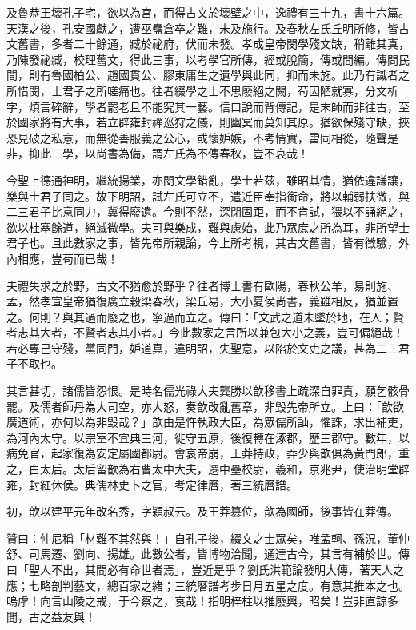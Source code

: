 \begin{pinyinscope}
及魯恭王壞孔子宅，欲以為宮，而得古文於壞壁之中，逸禮有三十九，書十六篇。天漢之後，孔安國獻之，遭巫蠱倉卒之難，未及施行。及春秋左氏丘明所修，皆古文舊書，多者二十餘通，臧於祕府，伏而未發。孝成皇帝閔學殘文缺，稍離其真，乃陳發祕臧，校理舊文，得此三事，以考學官所傳，經或脫簡，傳或間編。傳問民間，則有魯國柏公、趙國貫公、膠東庸生之遺學與此同，抑而未施。此乃有識者之所惜閔，士君子之所嗟痛也。往者綴學之士不思廢絕之闕，苟因陋就寡，分文析字，煩言碎辭，學者罷老且不能究其一藝。信口說而背傳記，是末師而非往古，至於國家將有大事，若立辟雍封禪巡狩之儀，則幽冥而莫知其原。猶欲保殘守缺，挾恐見破之私意，而無從善服義之公心，或懷妒嫉，不考情實，雷同相從，隨聲是非，抑此三學，以尚書為備，謂左氏為不傳春秋，豈不哀哉！

今聖上德通神明，繼統揚業，亦閔文學錯亂，學士若茲，雖昭其情，猶依違謙讓，樂與士君子同之。故下明詔，試左氏可立不，遣近臣奉指銜命，將以輔弱扶微，與二三君子比意同力，冀得廢遺。今則不然，深閉固距，而不肯試，猥以不誦絕之，欲以杜塞餘道，絕滅微學。夫可與樂成，難與慮始，此乃眾庶之所為耳，非所望士君子也。且此數家之事，皆先帝所親論，今上所考視，其古文舊書，皆有徵驗，外內相應，豈苟而已哉！

夫禮失求之於野，古文不猶愈於野乎？往者博士書有歐陽，春秋公羊，易則施、孟，然孝宣皇帝猶復廣立穀梁春秋，梁丘易，大小夏侯尚書，義雖相反，猶並置之。何則？與其過而廢之也，寧過而立之。傳曰：「文武之道未墜於地，在人；賢者志其大者，不賢者志其小者。」今此數家之言所以兼包大小之義，豈可偏絕哉！若必專己守殘，黨同門，妒道真，違明詔，失聖意，以陷於文吏之議，甚為二三君子不取也。

其言甚切，諸儒皆怨恨。是時名儒光祿大夫龔勝以歆移書上疏深自罪責，願乞骸骨罷。及儒者師丹為大司空，亦大怒，奏歆改亂舊章，非毀先帝所立。上曰：「歆欲廣道術，亦何以為非毀哉？」歆由是忤執政大臣，為眾儒所訕，懼誅，求出補吏，為河內太守。以宗室不宜典三河，徙守五原，後復轉在涿郡，歷三郡守。數年，以病免官，起家復為安定屬國都尉。會哀帝崩，王莽持政，莽少與歆俱為黃門郎，重之，白太后。太后留歆為右曹太中大夫，遷中壘校尉，羲和，京兆尹，使治明堂辟雍，封紅休侯。典儒林史卜之官，考定律曆，著三統曆譜。

初，歆以建平元年改名秀，字穎叔云。及王莽篡位，歆為國師，後事皆在莽傳。

贊曰：仲尼稱「材難不其然與！」自孔子後，綴文之士眾矣，唯孟軻、孫況，董仲舒、司馬遷、劉向、揚雄。此數公者，皆博物洽聞，通達古今，其言有補於世。傳曰「聖人不出，其間必有命世者焉」，豈近是乎？劉氏洪範論發明大傳，著天人之應；七略剖判藝文，總百家之緒；三統曆譜考步日月五星之度。有意其推本之也。嗚虖！向言山陵之戒，于今察之，哀哉！指明梓柱以推廢興，昭矣！豈非直諒多聞，古之益友與！


\end{pinyinscope}